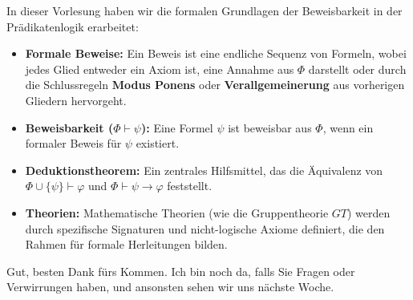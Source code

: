\begin{nice-box}
In dieser Vorlesung haben wir die formalen Grundlagen der Beweisbarkeit in der Prädikatenlogik erarbeitet:
\begin{itemize}
    \item \textbf{Formale Beweise:} Ein Beweis ist eine endliche Sequenz von Formeln, wobei jedes Glied entweder ein Axiom ist, eine Annahme aus $\Phi$ darstellt oder durch die Schlussregeln \textbf{Modus Ponens} oder \textbf{Verallgemeinerung} aus vorherigen Gliedern hervorgeht.
    \item \textbf{Beweisbarkeit ($\Phi \vdash \psi$):} Eine Formel $\psi$ ist beweisbar aus $\Phi$, wenn ein formaler Beweis für $\psi$ existiert.
    \item \textbf{Deduktionstheorem:} Ein zentrales Hilfsmittel, das die Äquivalenz von $\Phi \cup \{\psi\} \vdash \varphi$ und $\Phi \vdash \psi \rightarrow \varphi$ feststellt.
    \item \textbf{Theorien:} Mathematische Theorien (wie die Gruppentheorie $GT$) werden durch spezifische Signaturen und nicht-logische Axiome definiert, die den Rahmen für formale Herleitungen bilden.
\end{itemize}
\end{nice-box}

\begin{spoken-clean}[01:30:00 - 01:30:08]
Gut, besten Dank fürs Kommen. Ich bin noch da, falls Sie Fragen oder Verwirrungen haben, und ansonsten sehen wir uns nächste Woche.

\end{spoken-clean}

